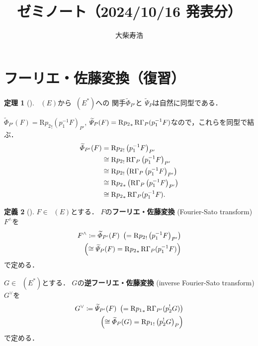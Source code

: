\documentclass[uplatex,dvipdfmx,a4paper,10pt,draft]{jsarticle}
\title{ゼミノート（2024/10/16 発表分）}
\author{大柴寿浩}
\makeatletter
\theoremstyle{definition}
\newcommand{\rr}{\mathbf{R}}
\renewenvironment{proof}[1][\proofname]{\par
  \pushQED{\qed}%
  \normalfont \topsep6\p@\@plus6\p@\relax
  \trivlist
  \item[\hskip\labelsep
         \bfseries
    {#1}]\ignorespaces
}{%
  \popQED\endtrivlist\@endpefalse
}
\renewcommand{\proofname}{証明.}
\numberwithin{equation}{section}
\newcommand{\RG}{\mathop{\mathrm{R}\hspace{-0pt}\Gamma}\nolimits}
\newcommand{\Rder}{\mathrm{R}}
\theoremstyle{mystyle}
\newtheorem{mythm}{定理}[section]
\newtheorem{mydfn}[mythm]{定義}
\newenvironment{thm}{\begin{thmbox}\begin{mythm}}{\end{mythm}\end{thmbox}}
\newenvironment{dfn}{\begin{dfnbox}\begin{mydfn}}{\end{mydfn}\end{dfnbox}}
\newcommand{\Dlcon}{\mathop{\mathsf{D}^{+}_{\rr_{>0}}}\nolimits}
\makeatother
\begin{document}
\maketitle

\section{フーリエ・佐藤変換（復習）{\cite[\S 3.7]{KS90}}}

\begin{thm}[{\cite[Theorem 3.7.7]{KS90}}]
    \(\Dlcon(E)\)から\(\Dlcon(E^\ast)\)への
    関手\(\widetilde{\varPhi}_{P'}\)と
    \(\widetilde{\varPsi}_{P}\)は自然に同型である．
\end{thm}
\begin{proof}
    \(
        \widetilde{\varPhi}_{P'}(F)
        =\Rder{p_2}_!\left(p_1^{-1}F\right)_{P'}
    \), \(
        \widetilde{\varPsi}_{P}(F)
        =\Rder{p_2}_{\ast}\RG_{P}(p_1^{-1}F)
    \)なので，これらを同型で結ぶ．
    \begin{align*}
        \widetilde{\varPhi}_{P'}(F)
        &=\Rder{p_2}_!\left(p_1^{-1}F\right)_{P'}\\
        &\cong\Rder{p_2}_!\RG_{P}\left(p_1^{-1}F\right)_{P'}\\
        &\cong\Rder{p_2}_!\left(\RG_{P}\left(p_1^{-1}F\right)_{P'}\right)\\
        &\cong\Rder{p_2}_{\ast}\left(
            \RG_{P}\left(p_1^{-1}F\right)_{P'}
        \right)\\
        &\cong\Rder{p_2}_{\ast}\RG_{P}(p_1^{-1}F).
    \end{align*}
\end{proof}
\begin{dfn}[{\cite[Definition 3.7.8]{KS90}}]
    \(F\in\Dlcon(E)\)とする．
    \(F\)の\textbf{フーリエ・佐藤変換} (Fourier-Sato transform) 
    \(F^{\wedge}\)を
    \begin{align*}
        F^{\wedge}
        \coloneqq \widetilde{\varPhi}_{P'}(F)\
        \left(=\Rder{p_2}_!\left(p_1^{-1}F\right)_{P'}\right)\\
        \left(
            \cong\widetilde{\varPsi}_{P}(F)
            =\Rder{p_2}_{\ast}\RG_{P}(p_1^{-1}F)
        \right)
    \end{align*}
    で定める．

    \(G\in\Dlcon(E^\ast)\)とする．
    \(G\)の\textbf{逆フーリエ・佐藤変換} (inverse 
    Fourier-Sato transform) \(G^{\vee}\)を
    \begin{align*}
        G^{\vee}
        \coloneqq \widetilde{\varPsi}_{P'}(F)\
        \left(=\Rder{p_1}_{\ast}\RG_{P'}(p_2^{!}G)\right)\\
        \left(
            \cong \widetilde{\varPhi}_{P}(G)
            =\Rder{p_1}_!\left(p_2^{!}G\right)_{P}
        \right)
    \end{align*}
    で定める．
\end{dfn}
\end{document}
